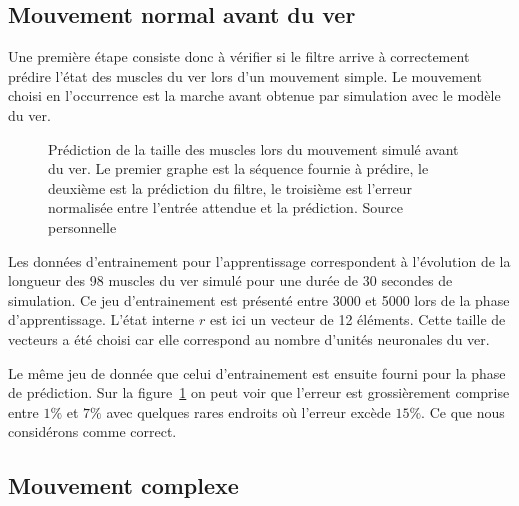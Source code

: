 \subsection{Mouvement normal avant du ver} %
\label{sub:Mouvement normal avant du ver}

Une première étape consiste donc à vérifier si le filtre arrive à correctement
prédire l'état des muscles du ver lors d'un mouvement simple. Le mouvement
choisi en l'occurrence est la marche avant obtenue par simulation avec le
modèle du ver.

\begin{figure}[ht]
   \begin{center}
   \end{center}
   \caption[Prédiction de la taille des muscles lors du mouvement simulé
   avant du ver]{Prédiction de la taille des muscles lors du mouvement simulé
   avant du ver. Le premier graphe est la séquence fournie à prédire, le
   deuxième est la prédiction du filtre, le troisième est l'erreur normalisée
   entre l'entrée attendue et la prédiction. Source personnelle}
   \label{fig:sequence_ver_complet}
\end{figure}

Les données d'entrainement pour l'apprentissage correspondent à l'évolution de
la longueur des 98 muscles du ver simulé pour une durée de 30 secondes de
simulation. Ce jeu d'entrainement est présenté entre 3000 et 5000 lors de la
phase d'apprentissage. L'état interne $r$ est ici un vecteur de 12 éléments.
Cette taille de vecteurs a été choisi car elle correspond au nombre d'unités
neuronales du ver.

Le même jeu de donnée que celui d'entrainement est ensuite fourni pour la phase
de prédiction. Sur la figure~\ref{fig:sequence_ver_complet} on peut voir que l'erreur
est grossièrement comprise entre $1\%$ et $7\%$ avec quelques rares endroits où l'erreur
excède $15\%$. Ce que nous considérons comme correct.


\subsection{Mouvement complexe} %
\label{sub:Mouvement complexe}



